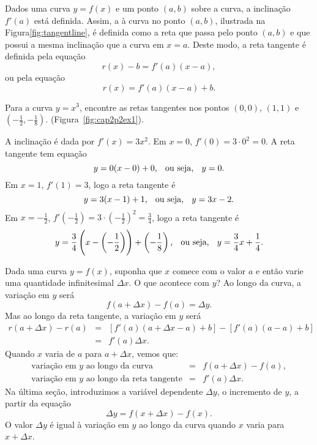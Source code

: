 Dados uma curva $y = f(x)$ e um ponto $(a, b)$ sobre a curva, a inclinação
$f'(a)$ está definida. Assim, a  à curva no ponto
$(a, b)$, ilustrada na Figura\ref{fig:tangentline}, é definida como a reta
que passa pelo ponto $(a, b)$ e que possui a mesma inclinação que a curva em
$x = a$. Deste modo, a reta tangente é definida pela equação
$$
  r(x) - b = f'(a)(x-a),
$$
ou pela equação
$$
  r(x) = f'(a)(x-a) + b.
$$


\begin{example}
Para a curva $y = x^3$, encontre as retas tangentes nos pontos $(0, 0)$,
$(1, 1)$ e $(-\frac{1}{2}, -\frac{1}{8})$. (Figura~\ref{fig:cap2p2ex1}).


A inclinação é dada por $f'(x) = 3x^2$. Em $x = 0$, $f'(0) = 3 \cdot 0^2 = 0$.
A reta tangente tem equação
$$
  y = 0 (x - 0) + 0 \text{, \; ou seja, \; } y = 0.
$$
Em $x = 1$, $f'(1) = 3$, logo a reta tangente é
$$
  y = 3(x-1)+1 \text{, \; ou seja, \; } y =  3x-2.
$$
Em $x = -\frac{1}{2}$, $f'(-\frac{1}{2}) = 3 \cdot (-\frac{1}{2})^2 =
\frac{3}{4}$, logo a reta tangente é
$$
  y = \frac{3}{4} \left(x - \left(-\frac{1}{2}\right)\right) + \left(-\frac{1}{8}\right) \text{, \; ou seja, \; } y =  \frac{3}{4}x + \frac{1}{4}.
$$
\end{example}

Dada uma curva $y = f(x)$, suponha que $x$ comece com o valor $a$ e então
varie uma quantidade infinitesimal $\Delta x$. O que acontece com $y$?
Ao longo da curva, a variação em $y$ será
$$
  f(a + \Delta x) - f(a) = \Delta y.
$$
Mas ao longo da reta tangente, a variação em $y$ será
\begin{eqnarray*}
  r(a + \Delta x) - r(a) & = &
    [f'(a)(a + \Delta x - a) + b] - [f'(a)(a-a) + b]\\
                         & = & f'(a) \Delta x.
\end{eqnarray*}
Quando $x$ varia de $a$ para $a + \Delta x$, vemos que:
\begin{eqnarray*}
  \text{variação em $y$ ao longo da curva} & = &
    f(a+\Delta x) - f(a), \\
  \text{variação em $y$ ao longo da reta tangente} & = &
    f'(a) \Delta x.
\end{eqnarray*}
Na última seção, introduzimos a variável dependente $\Delta y$, o incremento
de $y$, a partir da equação
$$
  \Delta y = f(x + \Delta x) - f(x).
$$
O valor $\Delta y$ é igual à variação em $y$ ao longo da curva quando
$x$ varia para $x + \Delta x$.

